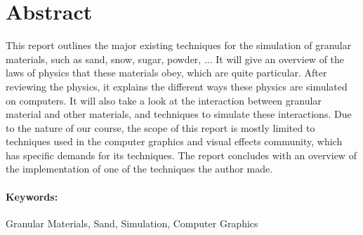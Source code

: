 
\ifx\isEmbedded\undefined


\fi

\section*{Abstract}
\label{sec:abstract}

This report outlines the major existing techniques for the simulation of granular materials, such as sand, snow, sugar, powder, ...  It will give an overview of the laws of physics that these materials obey, which are quite particular. After reviewing the physics, it explains the different ways these physics are simulated on computers. It will also take a look at the interaction between granular material and other materials, and techniques to simulate these interactions. Due to the nature of our course, the scope of this report is mostly limited to techniques used in the computer graphics and visual effects community, which has specific demands for its techniques. The report concludes with an overview of the implementation of one of the techniques the author made.

\paragraph*{Keywords:}{Granular Materials, Sand, Simulation, Computer Graphics}



\ifx\isEmbedded\undefined


\pagebreak

\fi